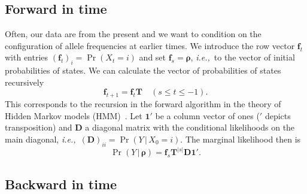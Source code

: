 \documentclass[preprint]{elsarticle}
\newcommand{\bs}[1]{\ensuremath{\boldsymbol{#1}}}
\newcommand\given{{\,|\,}}
\newcommand\eg{{\it e.g.,}}
\newcommand\ie{{\it i.e.,}}
\newcommand\x[1]{\ensuremath{X_{#1}}}
\newcommand\y{\ensuremath{Y}}
\newcommand\s{\ensuremath{s}}
\newcommand\fv[1]{\ensuremath{\mathbf{f}_{#1}}}
\newcommand\oneC{\ensuremath{\mathbf{1}'}}
\begin{document}

\subsection{Forward in time}

Often, our data are from the present and we want to condition on the configuration of allele frequencies at earlier times.  We introduce the row vector $\fv{t}$ with entries $(\fv{t})_{i} = \Pr(X_{t} = i)$ and set $\fv{\s} = \bs{\rho}$, \ie\ to the vector of initial probabilities of states. We can calculate the vector of probabilities of states recursively 
\begin{equation}
\fv{t+1} = \fv{t}\mathbf{T} \quad (\s \le t \le -1).
\end{equation}
This corresponds to the recursion in the forward algorithm in the theory of Hidden Markov models (HMM)~\citep[\eg][]{Vogl10}. Let $\oneC$ be a column vector of ones ($'$ depicts transposition) and $\mathbf{D}$ a diagonal matrix with the conditional likelihoods on the main diagonal, \ie\ $(\mathbf{D})_{ii}=\Pr(\y \given \x{0}=i)$. The marginal likelihood then is
\begin{equation}
\Pr(\y \given \bs{\rho}) = \fv{\s}\mathbf{T}^{|\s|}\mathbf{D}\oneC.
\end{equation}

\subsection{Backward in time}\label{section:backward}
\end{document}

